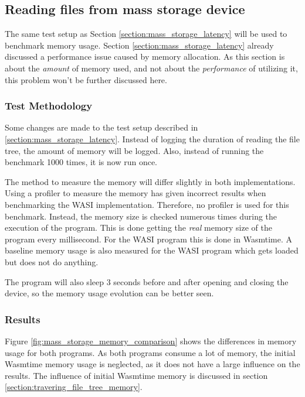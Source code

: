 \subsection{Reading files from mass storage device}
\label{section:reading_files_memory}
The same test setup as Section \ref{section:mass_storage_latency} will be used to benchmark memory usage. Section \ref{section:mass_storage_latency} already discussed a performance issue caused by memory allocation. As this section is about the \textit{amount} of memory used, and not about the \textit{performance} of utilizing it, this problem won't be further discussed here.

\subsubsection{Test Methodology}
\label{section:reading_files_memory_test_setup}
Some changes are made to the test setup described in \ref{section:mass_storage_latency}. Instead of logging the duration of reading the file tree, the amount of memory will be logged. Also, instead of running the benchmark 1000 times, it is now run once.

The method to measure the memory will differ slightly in both implementations. Using a profiler to measure the memory has given incorrect results when benchmarking the \acrshort{WASI} implementation. Therefore, no profiler is used for this benchmark. Instead, the memory size is checked numerous times during the execution of the program. This is done getting the \textit{real} memory size of the program every millisecond. For the \acrshort{WASI} program this is done in Wasmtime. A baseline memory usage is also measured for the \acrshort{WASI} program which gets loaded but does not do anything.

The program will also sleep 3 seconds before and after opening and closing the device, so the memory usage evolution can be better seen.

\subsubsection{Results} 

Figure \ref{fig:mass_storage_memory_comparison} shows the differences in memory usage for both programs. As both programs consume a lot of memory, the initial Wasmtime memory usage is neglected, as it does not have a large influence on the results. The influence of initial Wasmtime memory is discussed in section \ref{section:travering_file_tree_memory}.

